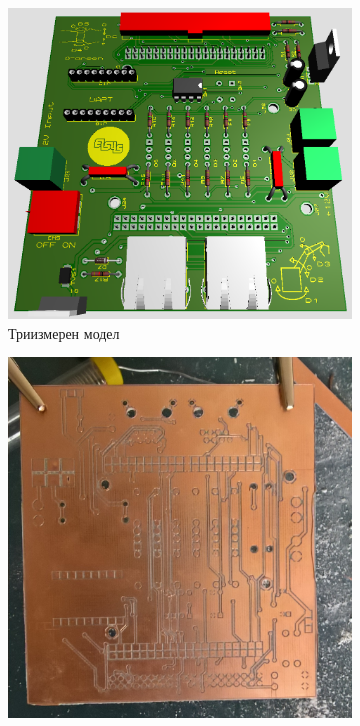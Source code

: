 \begin{figure}[!h]
    \centering
        \begin{subfigure}{0.32\textwidth}
        \centering
        \includegraphics[width=\linewidth]{pictures/3D_view.PNG}
        \caption{Триизмерен модел}
        \label{fig:3D}
    \end{subfigure}
    \hfill%
    \begin{subfigure}{0.32\textwidth}
        \centering
        \includegraphics[width=\linewidth]{pictures/main_board_proto.jpg}

\end{subfigure}
\end{figure}
